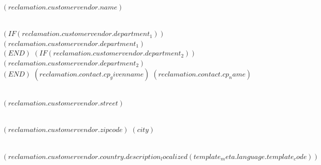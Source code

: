 \documentclass[paper=a4,fontsize=10pt]{scrartcl}
\begin{document}
\begin{letter}{
  $( reclamation.customervendor.name )$\strut\\
  $( IF (reclamation.customervendor.department_1) )$$( reclamation.customervendor.department_1 )$\\$( END )$%
  $( IF (reclamation.customervendor.department_2) )$$( reclamation.customervendor.department_2 )$\\$( END )$%
  $( reclamation.contact.cp_givenname )$ $( reclamation.contact.cp_name )$\strut\\
  $( reclamation.customervendor.street )$\strut\\
  $( reclamation.customervendor.zipcode )$ $( city )$\strut\\
  $( reclamation.customervendor.country.description_localized(template_meta.language.template_code) )$ \strut
    }

    \opening{
    }
    \thispagestyle{kivitendo.letter.first}

    \ekreklamationsformel


\end{letter}
\end{document}
